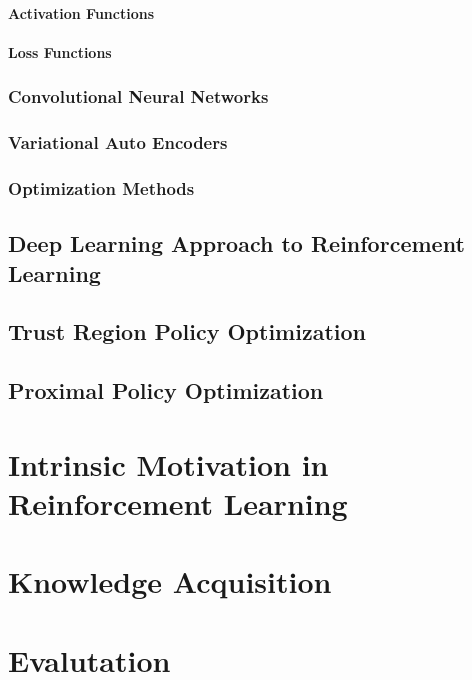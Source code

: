 \documentclass[draft,final]{vutinfth} %
\begin{document}
    \subsubsection{Activation Functions}

    \subsubsection{Loss Functions}

    \subsection{Convolutional Neural Networks}

    \subsection{Variational Auto Encoders}

    \subsection{Optimization Methods}


    \section{Deep Learning Approach to Reinforcement Learning}


    \section{Trust Region Policy Optimization}\label{sec:trust-region-policy-optimization}


    \section{Proximal Policy Optimization}\label{sec:proximal-policy-optimization}


    \chapter{Intrinsic Motivation in Reinforcement Learning}


    \chapter{Knowledge Acquisition}


    \chapter{Evalutation}
\end{document}
